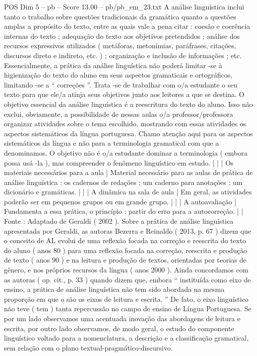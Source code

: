 \begin{textsample}{POS Dim 5 – pb – Score 13.00 – pb/pb\_em\_23.txt}
A análise linguística inclui tanto o trabalho sobre questões tradicionais da gramática quanto a questões amplas a propósito do texto, entre as quais vale a pena citar : coesão e coerência internas do texto ; adequação do texto aos objetivos pretendidos ; análise dos recursos expressivos utilizados ( metáforas, metonímias, paráfrases, citações, discursos direto e indireto, etc. ) ; organização e inclusão de informações ; etc.
Essencialmente, a prática da análise linguística não poderá limitar -se à higienização do texto do aluno em seus aspectos gramaticais e ortográficos, limitando -se a “ correções ”.
Trata -se de trabalhar com o/a estudante o seu texto para que ele/a atinja seus objetivos junto aos leitores a que se destina.
O objetivo essencial da análise linguística é a reescritura do texto do aluno.
Isso não exclui, obviamente, a possibilidade de nessas aulas o/a professor/professora organizar atividades sobre o tema escolhido, mostrando com essas atividades os aspectos sistemáticos da língua portuguesa.
Chamo atenção aqui para os aspectos sistemáticos da língua e não para a terminologia gramatical com que a denominamos.
O objetivo não é o/a estudante dominar a terminologia ( embora possa usá -la ), mas compreender o fenômeno linguístico em estudo. | | | Os materiais necessários para a aula | Material necessário para as aulas de prática de análise linguística : os cadernos de redações ; um caderno para anotações ; um dicionário e gramáticas. | | | A dinâmica na sala de aula | Em geral, as atividades poderão ser em pequenos grupos ou em grande grupo. | | | A autoavaliação | Fundamenta a essa prática, o princípio : partir do erro para a autocorreção. | | Fonte : Adaptado de Geraldi ( 2002 ).
Sobre a prática de análise linguística apresentada por Geraldi, as autoras Bezerra e Reinaldo ( 2013, p. 67 ) dizem que o conceito de AL evolui de uma reflexão focada na correção e reescrita do texto do aluno ( anos 80 ) para uma reflexão focada na correção, reescrita e produção de texto ( anos 90 ) e na leitura e produção de textos, orientadas por teorias de gênero, e nos próprios recursos da língua ( anos 2000 ).
Ainda concordamos com as autoras ( op. cit., p. 33 ) quando dizem que, embora “ instituída como eixo de ensino, a prática de análise linguística não tem sido abordada na mesma proporção em que o são os eixos de leitura e escrita. ” De fato, o eixo linguístico não teve ( tem ) tanta repercussão no campo de ensino de Língua Portuguesa.
Se por um lado observamos uma acentuada inovação das abordagens de leitura e escrita, por outro lado observamos, de modo geral, o estudo do componente linguístico voltado para a nomenclatura, a descrição e a classificação gramatical, sem relação com o plano textual-pragmático-discursivo.

\end{textsample}
